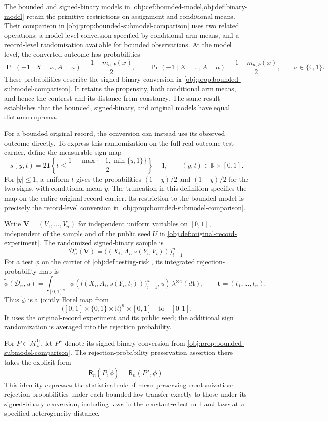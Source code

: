 \documentclass[11pt]{article}
\begin{document}
The bounded and signed-binary models in \cref{obj:def:bounded-model,obj:def:binary-model} retain the primitive restrictions on assignment and conditional means. Their comparison in \cref{obj:prop:bounded-submodel-comparison} uses two related operations: a model-level conversion specified by conditional arm means, and a record-level randomization available for bounded observations. At the model level, the converted outcome has probabilities
\[
\Pr(+1\mid X=x,A=a)=\frac{1+m_{a,P}(x)}2,
\qquad
\Pr(-1\mid X=x,A=a)=\frac{1-m_{a,P}(x)}2,
\qquad a\in\{0,1\}.
\]
These probabilities describe the signed-binary conversion in \cref{obj:prop:bounded-submodel-comparison}. It retains the propensity, both conditional arm means, and hence the contrast and its distance from constancy. The same result establishes that the bounded, signed-binary, and original models have equal distance suprema.

For a bounded original record, the conversion can instead use its observed outcome directly. To express this randomization on the full real-outcome test carrier, define the measurable sign map
\[
s(y,t)
=
2\mathbf 1\!\left\{
t\le \frac{1+\max\{-1,\min\{y,1\}\}}2
\right\}-1,
\qquad (y,t)\in\mathbb R\times[0,1].
\]
For \(|y|\le1\), a uniform \(t\) gives the probabilities \((1+y)/2\) and \((1-y)/2\) for the two signs, with conditional mean \(y\). The truncation in this definition specifies the map on the entire original-record carrier. Its restriction to the bounded model is precisely the record-level conversion in \cref{obj:prop:bounded-submodel-comparison}.

Write \(\boldsymbol V=(V_1,\ldots,V_n)\) for independent uniform variables on \([0,1]\), independent of the sample and of the public seed \(U\) in \cref{obj:def:original-record-experiment}. The randomized signed-binary sample is
\[
\mathcal D_n^{\,s}(\boldsymbol V)
=
\bigl((X_i,A_i,s(Y_i,V_i))\bigr)_{i=1}^n.
\]
For a test \(\phi\) on the carrier of \cref{obj:def:testing-risk}, its integrated rejection-probability map is
\[
\widetilde\phi(\mathcal D_n,u)
=
\int_{[0,1]^n}
\phi\!\left(
\bigl((X_i,A_i,s(Y_i,t_i))\bigr)_{i=1}^n,u
\right)
\,\lambda^{\otimes n}(d\boldsymbol t),
\qquad
\boldsymbol t=(t_1,\ldots,t_n).
\]
Thus \(\widetilde\phi\) is a jointly Borel map from
\[
\bigl([0,1]\times\{0,1\}\times\mathbb R\bigr)^n\times[0,1]
\quad\text{to}\quad[0,1].
\]
It uses the original-record experiment and its public seed; the additional sign randomization is averaged into the rejection probability.

For \(P\in\mathcal M_w^{\mathrm b}\), let \(P^{\,s}\) denote its signed-binary conversion from \cref{obj:prop:bounded-submodel-comparison}. The rejection-probability preservation assertion there takes the explicit form
\[
\mathsf R_n(P,\widetilde\phi)
=
\mathsf R_n(P^{\,s},\phi).
\]
This identity expresses the statistical role of mean-preserving randomization: rejection probabilities under each bounded law transfer exactly to those under its signed-binary conversion, including laws in the constant-effect null and laws at a specified heterogeneity distance.
\end{document}
